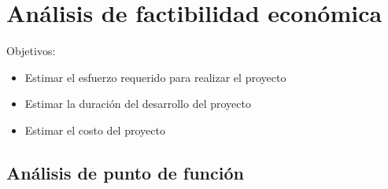     \section{Análisis de factibilidad económica}
        Objetivos:
        \begin{itemize}
            \item Estimar el esfuerzo requerido para realizar el proyecto
            \item Estimar la duración del desarrollo del proyecto
            \item Estimar el costo del proyecto
        \end{itemize}

        \subsection{Análisis de punto de función}
